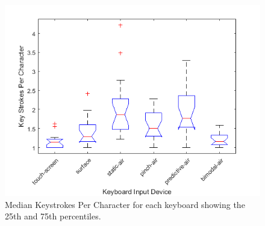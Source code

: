 \begin{figure}[t]
	\centering
	\includegraphics{Figures/fig_KSPC_boxplot}
	\caption[Keystrokes Per Character Boxplot]{Median Keystrokes Per Character for each keyboard showing the 25th and 75th percentiles.}
	\label{fig_KSPC_boxplot}
\end{figure}

